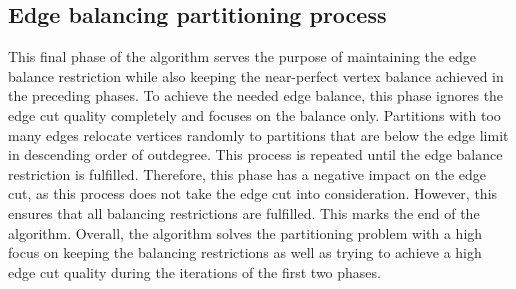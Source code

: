 \documentclass[acmsmall,nonacm,screen,review]{acmart}
\begin{document}
\subsection{Edge balancing partitioning process}
This final phase of the algorithm serves the purpose of maintaining the edge balance restriction while also keeping the near-perfect vertex balance achieved in the preceding phases. To achieve the needed edge balance, this phase ignores the edge cut quality completely and focuses on the balance only. Partitions with too many edges relocate vertices randomly to partitions that are below the edge limit in descending order of outdegree. This process is repeated until the edge balance restriction is fulfilled. Therefore, this phase has a negative impact on the edge cut, as this process does not take the edge cut into consideration. However, this ensures that all balancing restrictions are fulfilled. This marks the end of the algorithm. Overall, the algorithm solves the partitioning problem with a high focus on keeping the balancing restrictions as well as trying to achieve a high edge cut quality during the iterations of the first two phases.
\end{document}
